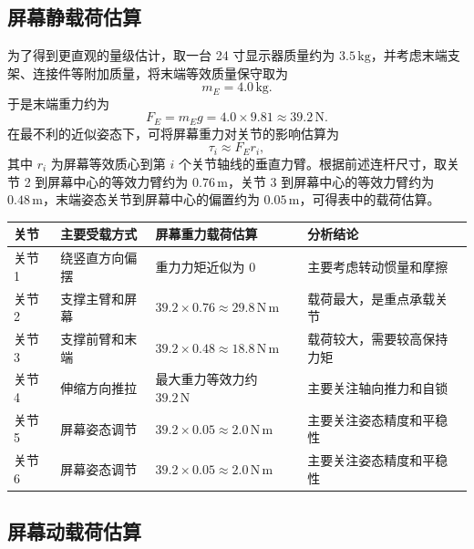 \documentclass[12pt,a4paper,UTF8]{article}
\begin{document}
\subsection{屏幕静载荷估算}

为了得到更直观的量级估计，取一台 24 寸显示器质量约为 $3.5\,\mathrm{kg}$，并考虑末端支架、连接件等附加质量，将末端等效质量保守取为
\[
m_E=4.0\,\mathrm{kg}.
\]
于是末端重力约为
\[
F_E=m_E g=4.0\times 9.81\approx 39.2\,\mathrm{N}.
\]
在最不利的近似姿态下，可将屏幕重力对关节的影响估算为
\[
\tau_i\approx F_E r_i ,
\]
其中 $r_i$ 为屏幕等效质心到第 $i$ 个关节轴线的垂直力臂。根据前述连杆尺寸，取关节 2 到屏幕中心的等效力臂约为 $0.76\,\mathrm{m}$，关节 3 到屏幕中心的等效力臂约为 $0.48\,\mathrm{m}$，末端姿态关节到屏幕中心的偏置约为 $0.05\,\mathrm{m}$，可得表中的载荷估算。

\begin{center}
    \centering
    \small
    \renewcommand{\arraystretch}{1.35}
    \begin{tabular}{|>{\centering\arraybackslash}p{}|>{\centering\arraybackslash}p{}|>{\centering\arraybackslash}p{}|>{\centering\arraybackslash}p{}|}
        \hline
        关节 & 主要受载方式 & 屏幕重力载荷估算 & 分析结论 \\
        \hline
        关节 1 & 绕竖直方向偏摆 & 重力力矩近似为 $0$ & 主要考虑转动惯量和摩擦 \\
        \hline
        关节 2 & 支撑主臂和屏幕 & $39.2\times 0.76\approx 29.8\,\mathrm{N\,m}$ & 载荷最大，是重点承载关节 \\
        \hline
        关节 3 & 支撑前臂和末端 & $39.2\times 0.48\approx 18.8\,\mathrm{N\,m}$ & 载荷较大，需要较高保持力矩 \\
        \hline
        关节 4 & 伸缩方向推拉 & 最大重力等效力约 $39.2\,\mathrm{N}$ & 主要关注轴向推力和自锁 \\
        \hline
        关节 5 & 屏幕姿态调节 & $39.2\times 0.05\approx 2.0\,\mathrm{N\,m}$ & 主要关注姿态精度和平稳性 \\
        \hline
        关节 6 & 屏幕姿态调节 & $39.2\times 0.05\approx 2.0\,\mathrm{N\,m}$ & 主要关注姿态精度和平稳性 \\
        \hline
    \end{tabular}
\end{center}

\subsection{屏幕动载荷估算}
\end{document}
